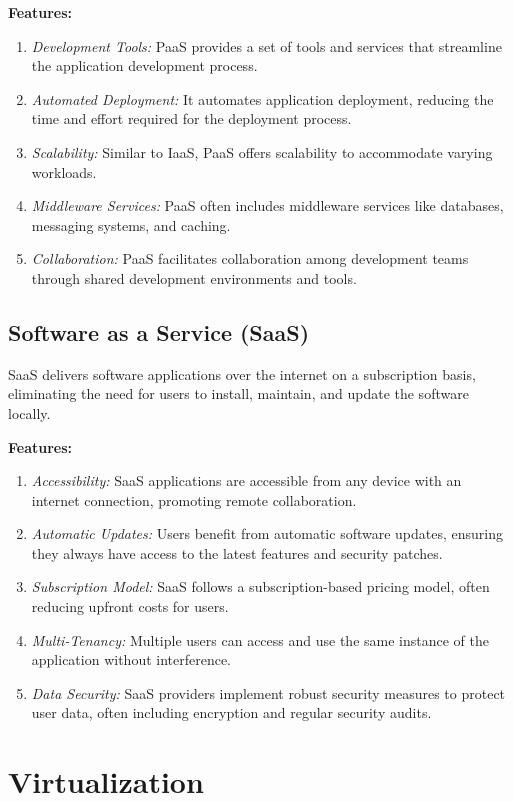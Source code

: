 \documentclass[11pt]{article}
\begin{document}
\textbf{Features:}
\begin{enumerate}
    \item \textit{Development Tools:} PaaS provides a set of tools and services that streamline the application development process.
    \item \textit{Automated Deployment:} It automates application deployment, reducing the time and effort required for the deployment process.
    \item \textit{Scalability:} Similar to IaaS, PaaS offers scalability to accommodate varying workloads.
    \item \textit{Middleware Services:} PaaS often includes middleware services like databases, messaging systems, and caching.
    \item \textit{Collaboration:} PaaS facilitates collaboration among development teams through shared development environments and tools.
\end{enumerate}

\subsection{Software as a Service (SaaS)}
SaaS delivers software applications over the internet on a subscription basis, eliminating the need for users to install, maintain, and update the software locally.

\textbf{Features:}
\begin{enumerate}
    \item \textit{Accessibility:} SaaS applications are accessible from any device with an internet connection, promoting remote collaboration.
    \item \textit{Automatic Updates:} Users benefit from automatic software updates, ensuring they always have access to the latest features and security patches.
    \item \textit{Subscription Model:} SaaS follows a subscription-based pricing model, often reducing upfront costs for users.
    \item \textit{Multi-Tenancy:} Multiple users can access and use the same instance of the application without interference.
    \item \textit{Data Security:} SaaS providers implement robust security measures to protect user data, often including encryption and regular security audits.
\end{enumerate}


\section{Virtualization}
\end{document}
